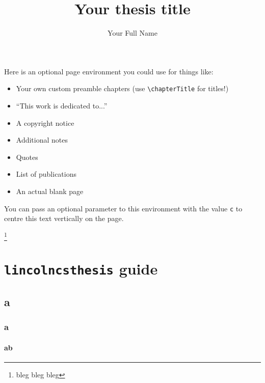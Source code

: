 \documentclass[harvard]{lincolncsthesis}
\title{\bfseries Your thesis title}
\author{Your Full Name}
\begin{document}


\begin{blankpage}
	Here is an optional page environment you could use for things like:
	\begin{itemize}
		\item Your own custom preamble chapters (use \texttt{\textbackslash chapterTitle} for titles!)
		\item ``This work is dedicated to...''
		\item A copyright notice
		\item Additional notes
		\item Quotes
		\item List of publications
		\item An actual blank page
	\end{itemize}
	You can pass an optional parameter to this environment with the value \texttt{c} to centre this text vertically on the page.
\end{blankpage}

\begin{acknowledgements}
\blindtext
\blindtext

\footnote{bleg bleg bleg}
\end{acknowledgements}


\begin{abstract}
\blindtext
\end{abstract}

\thesisTables
\thesisBodyStart

\chapter{\texttt{lincolncsthesis} guide}

\section{a}
\subsection{a}
\subsubsection{ab}
\end{document}
